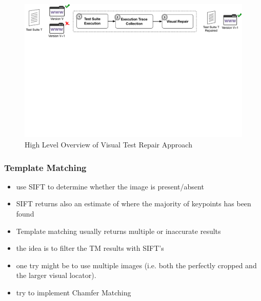 \begin{figure}[t]
\centering
\includegraphics[trim={0.0cm 18cm 0.0cm 0cm},clip,scale=0.435]{images/approach-reduced2}
\caption{High Level Overview of Visual Test Repair Approach}
\label{approach}
\end{figure}

\subsubsection{Template Matching}

\begin{itemize}
\item use SIFT to determine whether the image is present/absent
\item SIFT returns also an estimate of where the majority of keypoints has been found
\item Template matching usually returns multiple or inaccurate results
\item the idea is to filter the TM results with SIFT's
\item one try might be to use multiple images (i.e. both the perfectly cropped and the larger visual locator).
\item try to implement Chamfer Matching
\end{itemize}



